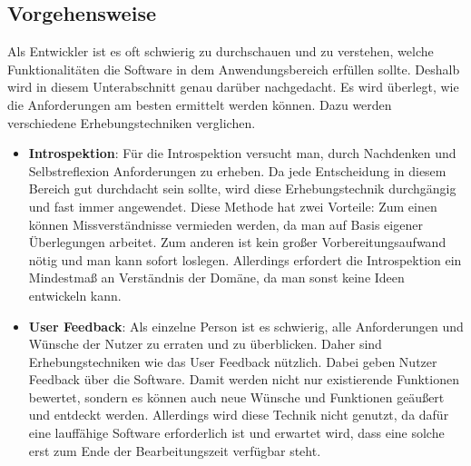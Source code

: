\subsection{Vorgehensweise}\label{subsection:anforderung:vorgehensweise}
Als Entwickler ist es oft schwierig zu durchschauen und zu verstehen, welche Funktionalitäten die Software in dem Anwendungsbereich erfüllen sollte.\newline%
Deshalb wird in diesem Unterabschnitt genau darüber nachgedacht. Es wird überlegt, wie die Anforderungen am besten ermittelt werden können. Dazu werden verschiedene Erhebungstechniken verglichen. %
%
\begin{itemize}
	\item \textbf{Introspektion}: %
		Für die Introspektion versucht man, durch Nachdenken und Selbstreflexion Anforderungen zu erheben. %
		Da jede Entscheidung in diesem Bereich gut durchdacht sein sollte, wird diese Erhebungstechnik durchgängig und fast immer angewendet. %
		Diese Methode hat zwei Vorteile: Zum einen können Missverständnisse vermieden werden, da man auf Basis eigener Überlegungen arbeitet. Zum anderen ist kein großer Vorbereitungsaufwand nötig und man kann sofort loslegen. %
		Allerdings erfordert die Introspektion ein Mindestmaß an Verständnis der Domäne, da man sonst keine Ideen entwickeln kann.%
	\item \textbf{User Feedback}: %
		Als einzelne Person ist es schwierig, alle Anforderungen und Wünsche der Nutzer zu erraten und zu überblicken. Daher sind Erhebungstechniken wie das User Feedback nützlich. %
		Dabei geben Nutzer Feedback über die Software. Damit werden nicht nur existierende Funktionen bewertet, sondern es können auch neue Wünsche und Funktionen geäußert und entdeckt werden. %
		Allerdings wird diese Technik nicht genutzt, %
			da dafür eine lauffähige Software erforderlich ist und erwartet wird, dass eine solche erst zum Ende der Bearbeitungszeit verfügbar steht.%

\end{itemize}
